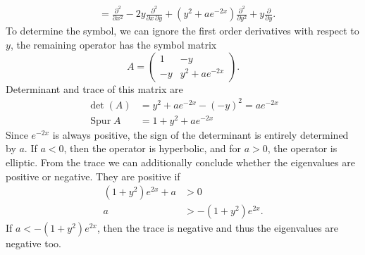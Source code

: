 \begin{loesung}
\begin{align*}
\\
&=
\frac{\partial^2}{\partial x^2} - 2y\frac{\partial^2}{\partial x\,\partial y}
+(y^2+ae^{-2x})\frac{\partial^2}{\partial y^2}+y\frac{\partial}{\partial y}.
\end{align*}
To determine the symbol, we can ignore the first order derivatives
with respect to $y$, the remaining operator has the symbol matrix
\[
A=\begin{pmatrix}
1&-y\\
-y&y^2+ae^{-2x}
\end{pmatrix}.
\]
Determinant and trace of this matrix are
\begin{align*}
\det(A) &= y^2+ae^{-2x}-(-y)^2=ae^{-2x}
\\
\operatorname{Spur}A&=1+y^2+ae^{-2x}
\end{align*}
Since $e^{-2x}$ is always positive, the sign of the determinant is
entirely determined by $a$.
If $a<0$, then the operator is hyperbolic, and for $a>0$, the
operator is elliptic.
From the trace we can additionally conclude whether the eigenvalues
are positive or negative.
They are positive if
\begin{align*}
(1+y^2)e^{2x}+a&>0
\\
a &> -(1+y^2)e^{2x}.
\end{align*}
If $a < -(1+y^2)e^{2x}$, then the trace is negative and thus the eigenvalues
are negative too.
\end{loesung}



